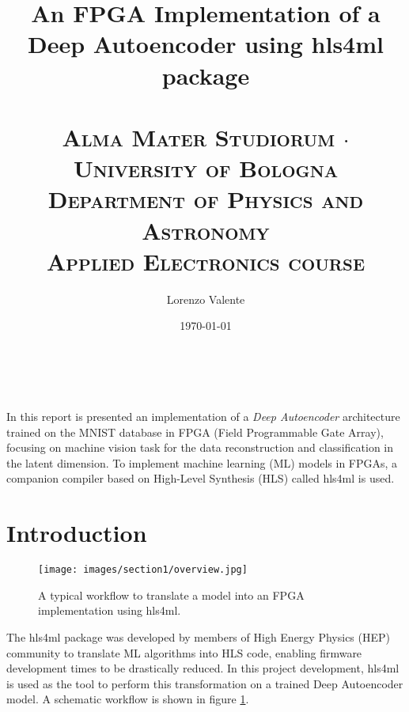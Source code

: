 \documentclass{article}
\title{
  \huge{\textbf{An FPGA Implementation of a\\ Deep Autoencoder using hls4ml package \\}}
  \Large{\textsc{\\ Alma Mater Studiorum $\cdot$ University of Bologna \\ }}
  \large{\textsc{Department of Physics and Astronomy \\}}
  \normalsize{\textsc{Applied Electronics course}}
  } %
\author{Lorenzo Valente} %
\date{\today} %
\begin{document}
\maketitle %

\begin{center}
\begin{tabular}{l r}
\end{tabular}
\end{center}



\section*{}
In this report is presented an implementation of a \textit{Deep Autoencoder} 
architecture trained on the MNIST database in FPGA (Field Programmable Gate Array), 
focusing on machine vision task for the data reconstruction and classification in the latent dimension.
To implement machine learning (ML) models in FPGAs, a companion compiler 
based on High-Level Synthesis (HLS) called hls4ml is used. 


\section{Introduction}


\begin{figure}[H]
  \centering
  \texttt{[image: images/section1/overview.jpg]}
  \caption{A typical workflow to translate a model into an FPGA implementation using hls4ml.}
  \label{fig:overview}
\end{figure}


The hls4ml package was developed by members of High Energy Physics (HEP) community
to translate ML algorithms into HLS code, enabling firmware development times to be drastically reduced.
In this project development, hls4ml is used as the tool to perform 
this transformation on a trained Deep Autoencoder model.
A schematic workflow is shown in figure \ref{fig:overview}.
\end{document}
